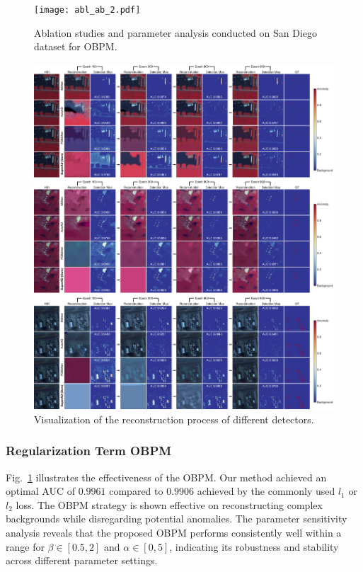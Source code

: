 \begin{figure}[htbp]
  \centering
  {\texttt{[image: abl\_ab\_2.pdf]}}
  \caption{Ablation studies and parameter analysis conducted on San Diego dataset for OBPM.}
  \label{fig:abl-ab}
\end{figure}


\begin{figure}[htbp]
  \centering
  \includegraphics[width=1\linewidth]{Figures/PDF/imp_viz.pdf}
  \caption{Visualization of the reconstruction process of different detectors.}
  \label{fig:imp-viz}
\end{figure}



\subsubsection{Regularization Term OBPM}
Fig.~\ref{fig:abl-ab} illustrates the effectiveness of the OBPM. Our method achieved an optimal AUC of $0.9961$ compared to $0.9906$ achieved by the commonly used $l_1$ or $l_2$ loss. The OBPM strategy is shown effective on reconstructing complex backgrounds while disregarding potential anomalies. The parameter sensitivity analysis reveals that the proposed OBPM performs consistently well within a range for $\beta \in [0.5, 2]$ and $\alpha \in [0, 5]$, indicating its robustness and stability across different parameter settings.




